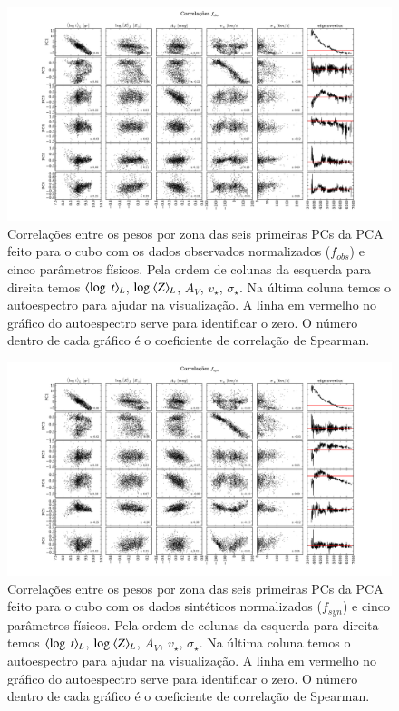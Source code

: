 \begin{figure}
    \includegraphics[width=1.2\textwidth,angle=-90]{figuras/K0277-correl-f_obs_norm-PCvsPhys.pdf}
	\caption[Correlações PCs vs. par\^ametros f\'isicos - $f_{obs}$.]
    {Correlações entre os pesos por zona das seis primeiras PCs da PCA feito para o cubo com os dados observados
    normalizados ($f_{obs}$) e cinco parâmetros físicos. Pela ordem de colunas da esquerda para direita temos
    $\meanL{\log\ t}$, $\log\ \meanL{Z}$, $A_V$, $v_{\star}$, $\sigma_{\star}$. Na última coluna temos o autoespectro para ajudar na
    visualização. A linha em vermelho no gráfico do autoespectro serve para identificar o zero. O número dentro de
    cada gráfico é o coeficiente de correlação de Spearman.}
    \label{fig:K0277correfobsnorm}
\end{figure}

\begin{figure}
    \includegraphics[width=1.2\textwidth, angle=-90]{figuras/K0277-correl-f_syn_norm-PCvsPhys.pdf}
	\caption[Correlações PCs vs. par\^ametros f\'isicos - $f_{syn}$.]
    {Correlações entre os pesos por zona das seis primeiras PCs da PCA feito para o cubo com os dados sintéticos
    normalizados ($f_{syn}$) e cinco parâmetros físicos. Pela ordem de colunas da esquerda para direita temos
    $\meanL{\log\ t}$, $\log\ \meanL{Z}$, $A_V$, $v_{\star}$, $\sigma_{\star}$. Na última coluna temos o autoespectro para ajudar na visualização.
    A linha em vermelho no gráfico do autoespectro serve para identificar o zero. O número dentro de cada gráfico é o
    coeficiente de correlação de Spearman.}
    \label{fig:K0277correfsynorm}
\end{figure}

